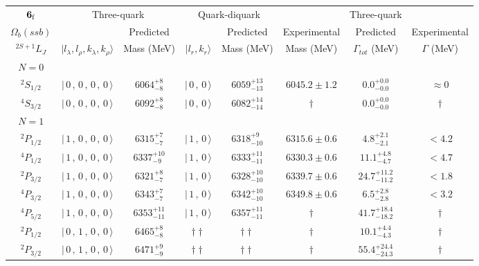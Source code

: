 \begin{tabular}{c| c c c c c c c}\hline \hline
${\bf {6}}_{\rm f}$ & \multicolumn{2}{c}{Three-quark} &  \multicolumn{2}{c}{Quark-diquark}   &    &  Three-quark  &\\ 
$\Omega_{b}(ssb)$ &   & Predicted  &   &  Predicted   &  Experimental &  Predicted            & Experimental \\ 
 $^{2S+1}L_{J}$ & $\vert l_{\lambda}, l_{\rho}, k_{\lambda}, k_{\rho} \rangle$ & Mass (MeV)  & $\vert l_{r}, k_{r} \rangle$  &  Mass (MeV)   &  Mass (MeV)   &  $\Gamma_{tot}$ (MeV) & $\Gamma$ (MeV) \\ \hline
\hline
 $N=0$  &  &  &  &  &  \\ 
$^{2}S_{1/2}$ & $\vert \,0\,,\,0\,,\,0\,,\,0 \,\rangle $ & $6064^{+8}_{-8}$ & $\vert \,0\,,\,0 \,\rangle$ & $6059^{+13}_{-13}$ & $6045.2\pm 1.2$ & $0.0^{+0.0}_{-0.0}$ & $\approx 0$ \\ 
$^{4}S_{3/2}$ & $\vert \,0\,,\,0\,,\,0\,,\,0 \,\rangle $ & $6092^{+8}_{-8}$ & $\vert \,0\,,\,0 \,\rangle$ & $6082^{+14}_{-14}$ & $\dagger$ & $0.0^{+0.0}_{-0.0}$ & $\dagger$ \\ 
\hline
 $N=1$  &  &  &  &  &  \\ 
$^{2}P_{1/2}$ & $\vert \,1\,,\,0\,,\,0\,,\,0 \,\rangle $ & $6315^{+7}_{-7}$ & $\vert \,1\,,\,0 \,\rangle$ & $6318^{+9}_{-10}$ & $6315.6\pm 0.6$ & $4.8^{+2.1}_{-2.1}$ & $<4.2$ \\ 
$^{4}P_{1/2}$ & $\vert \,1\,,\,0\,,\,0\,,\,0 \,\rangle $ & $6337^{+10}_{-9}$ & $\vert \,1\,,\,0 \,\rangle$ & $6333^{+11}_{-11}$ & $6330.3\pm 0.6$ & $11.1^{+4.8}_{-4.7}$ & $<4.7$ \\ 
$^{2}P_{3/2}$ & $\vert \,1\,,\,0\,,\,0\,,\,0 \,\rangle $ & $6321^{+8}_{-7}$ & $\vert \,1\,,\,0 \,\rangle$ & $6328^{+10}_{-10}$ & $6339.7\pm 0.6$ & $24.7^{+11.2}_{-11.2}$ & $<1.8$ \\ 
$^{4}P_{3/2}$ & $\vert \,1\,,\,0\,,\,0\,,\,0 \,\rangle $ & $6343^{+7}_{-7}$ & $\vert \,1\,,\,0 \,\rangle$ & $6342^{+10}_{-10}$ & $6349.8\pm 0.6$ & $6.5^{+2.8}_{-2.8}$ & $<3.2$ \\ 
$^{4}P_{5/2}$ & $\vert \,1\,,\,0\,,\,0\,,\,0 \,\rangle $ & $6353^{+11}_{-11}$ & $\vert \,1\,,\,0 \,\rangle$ & $6357^{+11}_{-11}$ & $\dagger$ & $41.7^{+18.4}_{-18.2}$ & $\dagger$ \\ 
$^{2}P_{1/2}$ & $\vert \,0\,,\,1\,,\,0\,,\,0 \,\rangle $ & $6465^{+8}_{-8}$ & $\dagger\dagger$ & $\dagger\dagger$ & $\dagger$ & $10.1^{+4.4}_{-4.3}$ & $\dagger$ \\ 
$^{2}P_{3/2}$ & $\vert \,0\,,\,1\,,\,0\,,\,0 \,\rangle $ & $6471^{+9}_{-9}$ & $\dagger\dagger$ & $\dagger\dagger$ & $\dagger$ & $55.4^{+24.4}_{-24.3}$ & $\dagger$ \\ 

\end{tabular}
